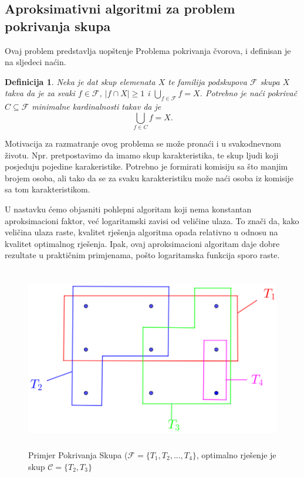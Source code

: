 \documentclass[a4paper, utf8, 11pt, colorlinks]{book}
\newtheorem{definition}{Definicija}[chapter]
\theoremstyle{definition}
\begin{document}
 \subsection{Aproksimativni algoritmi za problem pokrivanja skupa}
Ovaj problem predstavlja uopštenje Problema pokrivanja čvorova, i definisan je na sljedeci naćin.
\begin{definition}
    Neka je dat skup elemenata $X$ te familija podskupova $\mathcal{F}$ skupa $X$ takva da je za svaki $f\in \mathcal{F}$, $|f \cap X| \geq 1$ i $\bigcup_{f \in \mathcal{F}} f = X$. 
	    Potrebno je naći pokrivač $C \subseteq \mathcal{F}$ minimalne kardinalnosti takav da je 
	    $$ \bigcup_{f \in C} f = X.$$
\end{definition}


Motivacija za razmatranje ovog problema se može pronaći i u svakodnevnom životu. Npr. pretpostavimo da imamo skup karakteristika, te skup ljudi koji posjeduju pojedine karakeristike. Potrebno je formirati komisiju sa što manjim brojem osoba, ali tako da se za svaku karakteristiku može naći osoba iz komisije sa tom karakteristikom.
 

 U nastavku ćemo objasniti pohlepni algoritam koji nema konstantan aproksimacioni faktor, već logaritamski zavisi od veličine ulaza. To znači da, kako veličina ulaza raste, kvalitet rješenja algoritma opada relativno u odnosu na kvalitet optimalnog rješenja. Ipak,  ovaj aproksimacioni algoritam  daje dobre rezultate u praktičnim primjenama, pošto logaritamska funkcija sporo raste.

\begin{figure}
	\centering
	\includegraphics[width=120mm, height=80mm]{set-cover-1.eps}
	\caption{Primjer Pokrivanja Skupa ($\mathcal{F}=\{T_1,T_2,...,T_4\}$, optimalno rješenje je skup $\mathcal{C}=\{T_2, T_3\}$}
	 \label{fig:set-cover-1}
\end{figure}
 
\end{document}
